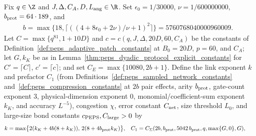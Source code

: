 \begin{definition}
    \label{def:polynomial_peps_explicit_constants}
    \leanok
    Fix $q\in\Z$ and $J,\Delta,C_A,D,L_{\rm ang}\in\R$. Set $\epsilon_0=1/30000$, $\nu=1/600000000$, $b_{\rm prot}=64\cdot189$, and
    \begin{align}
        b=\max\{18,\lceil((4+8\epsilon_0+2\nu)/\nu+1)^2\rceil\}
        =5760768040000960009.
    \end{align}
    Let $C=\max\{q^{81},1+10D\}$ and $c=c(q,J,\Delta,20D,60,C_A)$ be the constants of Definition~\ref{def:peps_adaptive_patch_constants} at $B_0=20D$, $p=60$, and $C_A$; let $G,k_K$ be as in Lemma~\ref{thm:peps_dyadic_protocol_explicit_constants} for $C'=\lceil C\rceil$, $c'=\lceil c\rceil$; and set $C_E=\max\{10080,2b+1\}$. Define the link exponent $k$ and prefactor $C_1$ (from Definitions~\ref{def:peps_sampled_network_constants} and~\ref{def:peps_compression_constants} at $2b$ pair effects, arity $b_{\rm prot}$, gate-count exponent $3$, physical-dimension exponent $0$, monomial/coefficient-sum exponent $k_K$, and accuracy $L^{-5}$), congestion $\chi$, error constant $C_{\rm net}$, size threshold $L_0$, and large-size bond constants $c_{\rm PEPS},C_{\rm large}>0$ by
    \begin{align}
        k   & =\max\bigl\{2(k_K+4b(8+k_K)),\,2(8+4b_{\rm prot}k_K)\bigr\},   &
        C_1 & =C_\Sigma(2b,b_{\rm prot},5042\,b_{\rm prot},q,\max\{G,0\},G),

\end{align}
\end{definition}
